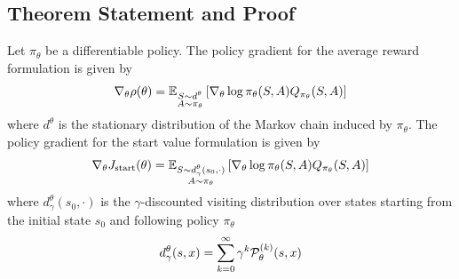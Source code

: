 \subsection{Theorem Statement and Proof}
\begin{theorem}
	Let $\pi_\theta$ be a differentiable policy. The policy gradient for the average reward formulation is given by
	\begin{equation}
		\nabla_\theta \rho(\theta) =
		\E[\substack{S \sim d^\theta\\A \sim \pi_\theta}]{\nabla_\theta\log
		\pi_\theta(S,A) Q_{\pi_\theta}(S, A)}
	\end{equation}
	where $d^\theta$ is the stationary distribution of the Markov chain induced by $\pi_\theta$. The policy gradient for the start value formulation is given by
	\begin{equation}
		\nabla_\theta J_{\text{start}}(\theta) =
		\E[\substack{S \sim d_\gamma^\theta(s_0, \cdot)\\A \sim \pi_\theta}]{\nabla_\theta\log
		\pi_\theta(S,A) Q_{\pi_\theta}(S, A)}
	\end{equation}
	where $d_\gamma^\theta(s_0, \cdot)$ is the $\gamma$-discounted visiting distribution over states starting from the initial state $s_0$ and following policy $\pi_\theta$
		\begin{equation}
			d_\gamma^\theta(s, x) = \sum_{k=0}^{\infty} \gamma^k \calP_\theta^{(k)}(s, x)
		\end{equation}
\end{theorem}
